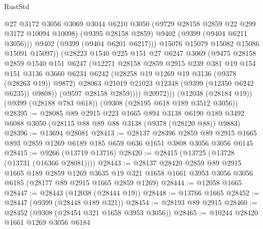 \begin{lexlean}{RustStd}
\begin{coremodule}
                      @27
                      @3172
                      @3056
                      @3069
                      @3044
                      @6210
                      @3050
                      (@9729 @28158 @2859 @22 @299 @3172 @10094 @10098)
                      (@9395 @28158 @2859)
                      @9402
                      (@9399 (@9404 @6211 @3056)))
                    @9402
                    (@9399 (@9404 @6201 @6217)))
                  @15076
                  @15079
                  @15082
                  @15086
                  @15091
                  @15097))
              (@28223
                @1540
                @225
                @151
                @27
                @6247
                @3069
                (@9475
                  @28158
                  @2859
                  @1540
                  @151
                  @6247
                  (@12271
                    @28158
                    @2859
                    @2915
                    @239
                    @381
                    @19
                    @154
                    @151
                    @3136
                    @3660
                    @6234
                    @6242
                    (@28258 @19 @1269 @19 @3136 (@9378 (@28263 @19)) @9872)
                    @28063
                    @21019
                    @21023
                    @12348
                    (@9399 (@12350 @6242 @6235))
                    @9808))
                (@9597 @28158 @2859))))
          @20972)))
    (@12038 (@28184 @19))
    (@9399 (@28188 @783 @618))
    (@9308 (@28195 @618 @189 @3512 @3056))
@28395 := @28085
    @89
    @2915
    @223
    @1665
    @894
    @3138
    @6190
    @189
    @3492
    @6088
    @3050
    (@28115 @88 @89 @88 @3138 (@9378 (@28120 @88)) @9883)
@28396 := @13694 @28081
@28413 := @28137
    @28396
    @2859
    @89
    @2915
    @1665
    @893
    @2859
    @1269
    @6189
    @185
    @659
    @636
    @1651
    @3808
    @3056
    @3056
    @6145
@28415 := @9266 (@13719 @13716)
@28420 := @28415 (@13725 (@13728 (@13731 (@16366 @28081))))
@28443 := @28137
    @28420
    @2859
    @89
    @2915
    @1665
    @189
    @2859
    @1269
    @3635
    @19
    @321
    @1658
    @1661
    @3953
    @3056
    @3056
    @6185
    (@28177 @89 @2915 @1665 @2859 @1269)
@28444 := @12058 @1665
@28447 := @28443 (@12038 (@28444 @19))
@28448 := @13766 @1665
@28452 := @28447 (@9399 (@28448 @189 @321))
@28454 := @28193 @89 @2915
@28460 := @28452 (@9308 (@28454 @321 @1658 @3953 @3056))
@28465 := @10244 @28420 @1661 @1269 @3056 @6184

\end{coremodule}
\end{lexlean}
